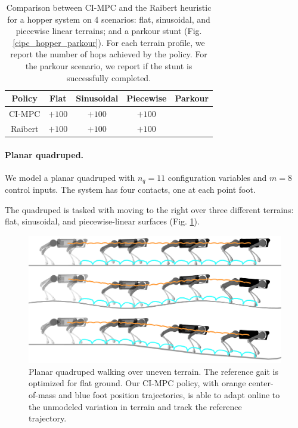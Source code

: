 \begin{table}[H]
	\centering
	\caption[Comparison between CI-MPC and Raibert-heuristic policies for hopper locomotion and parkour]{Comparison between CI-MPC and the Raibert heuristic for a hopper system on 4 scenarios: flat, sinusoidal, and piecewise linear terrains; and a parkour stunt (Fig. \ref{cipc_hopper_parkour}). For each terrain profile, we report the number of hops achieved by the policy. For the parkour scenario, we report if the stunt is successfully completed.}
	
	\begin{tabular}{c c c c c}
		\toprule
		\textbf{Policy} &
		\textbf{Flat} &
		\textbf{Sinusoidal} &
		\textbf{Piecewise} &
		\textbf{Parkour}\\
		\toprule
		CI-MPC & $+100$ & $+100$ & $+100$ & \checkmark \\ 
		Raibert & $+100$ & $+100$ & $+100$ & \ding{53} \\ 
		\toprule
	\end{tabular}
	\label{cipc_hopper_results}
\end{table}

\paragraph{Planar quadruped.}
We model a planar quadruped with $n_q = 11$ configuration variables and $m = 8$ control inputs. The system has four contacts, one at each point foot. 

The quadruped is tasked with moving to the right over three different terrains: flat, sinusoidal, and piecewise-linear surfaces (Fig. \ref{cipc_quadruped_traj}). 

\begin{figure}[H]
	\centering
	\includegraphics[width=.48\textwidth]{ci_pc/quadruped.png}
	\caption[Planar quadruped walking over uneven terrain]{Planar quadruped walking over uneven terrain. The reference gait is optimized for flat ground.  Our CI-MPC policy, with orange center-of-mass and blue foot position trajectories, is able to adapt online to the unmodeled variation in terrain and track the reference trajectory.}
	\label{cipc_quadruped_traj}
\end{figure}

